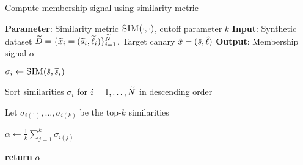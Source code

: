 \begin{algorithm}
\caption{Compute membership signal using similarity metric}

\begin{algorithmic}[1]
\STATE \textbf{Parameter}: Similarity metric $\textsc{SIM}(\cdot, \cdot)$, cutoff parameter $k$
\STATE \textbf{Input}: Synthetic dataset ${\widetilde{D}} = \{ {\widetilde{x}}_i = ({\widetilde{s}}_i, {\widetilde{\ell}}_i) \}_{i=1}^{\widetilde{N}}$, Target canary ${\hat{x}} = ({\hat{s}}, {\hat{\ell}})$
\STATE \textbf{Output}: Membership signal $\alpha$

    \STATE $\sigma_i \gets \textsc{SIM}({\hat{s}}, {\widetilde{s}}_i)$ \hfill {} 
\ENDFOR

\STATE Sort similarities $\sigma_i$ for $i = 1, \ldots, {\widetilde{N}}$ in descending order 

\STATE Let $\sigma_{i(1)}, \dots, \sigma_{i(k)}$ be the top-$k$ similarities

\STATE $\alpha \gets \frac{1}{k} \sum_{j=1}^k \sigma_{i(j)}$ \hfill {}

\STATE \textbf{return} $\alpha$ 
\end{algorithmic}
\label{alg:sim_mia}
\end{algorithm}
